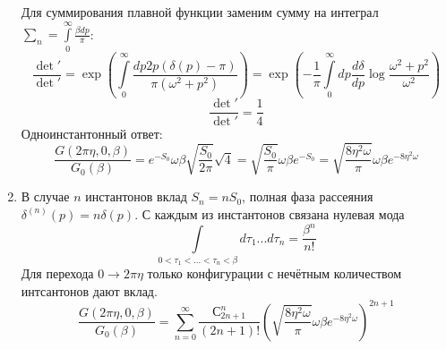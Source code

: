 \documentclass[12pt]{article}
\theoremstyle{definition}
\begin{document}
\begin{enumerate}
    Для суммирования плавной функции заменим сумму на интеграл $\sum\limits_n=\int\limits_0^\infty\frac{\beta dp}{\pi}$:
    \begin{equation}
        \frac{\det'}{\det'}=\exp\left(\int\limits_0^\infty\frac{dp2p(\delta(p)-\pi)}{\pi(\omega^2+p^2)}\right)=\exp\left(-\frac{1}{\pi}\int\limits_0^\infty dp\frac{d\delta}{dp}\log\frac{\omega^2+p^2}{\omega^2}\right)
    \end{equation}
    \begin{equation}
        \boxed{\frac{\det'}{\det'}=\frac{1}{4}}
    \end{equation}
    Одноинстантонный ответ:
    \begin{equation}
        \boxed{\frac{G(2\pi\eta,0,\beta)}{G_0(\beta)}=e^{-S_0}\omega\beta\sqrt{\frac{S_0}{2\pi}}\sqrt{4}=\sqrt{\frac{S_0}{\pi}}\omega\beta e^{-S_0}=\sqrt{\frac{8\eta^2\omega}{\pi}}\omega\beta e^{-8\eta^2\omega}}
    \end{equation}
    \item В случае $n$ инстантонов вклад $S_n=nS_0$, полная фаза рассеяния $\delta^{(n)}(p)=n\delta(p)$. С каждым из инстантонов связана нулевая мода
    \begin{equation}
        \int\limits_{0<\tau_1<...<\tau_n<\beta}d\tau_1...d\tau_n=\frac{\beta^n}{n!}
    \end{equation}
    Для перехода $0\rightarrow 2\pi\eta$ только конфигурации с нечётным количеством интсантонов дают вклад.
    \begin{equation}
        \boxed{\frac{G(2\pi\eta,0,\beta)}{G_0(\beta)}=\sum\limits_{n=0}^\infty\frac{С^n_{2n+1}}{(2n+1)!}\left(\sqrt{\frac{8\eta^2\omega}{\pi}}\omega\beta e^{-8\eta^2\omega}\right)^{2n+1}}
    \end{equation}
\end{enumerate}
\end{document}
